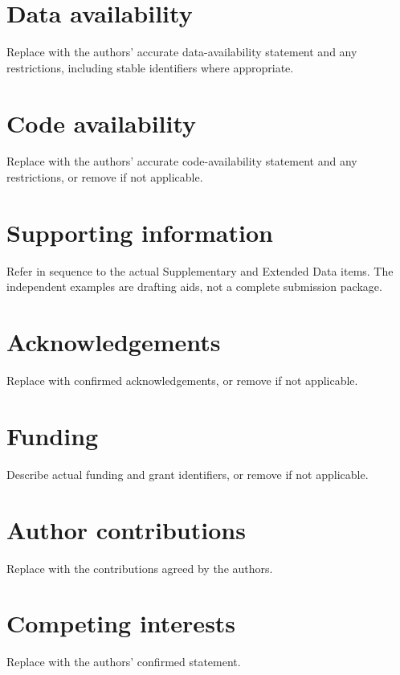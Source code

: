 \documentclass[11pt]{article}
\begin{document}
\section*{Data availability}
Replace with the authors' accurate data-availability statement and any
restrictions, including stable identifiers where appropriate.
\section*{Code availability}
Replace with the authors' accurate code-availability statement and any
restrictions, or remove if not applicable.




\section*{Supporting information}
Refer in sequence to the actual Supplementary and Extended Data items.
The independent examples are drafting aids, not a complete submission package.

\section*{Acknowledgements}
Replace with confirmed acknowledgements, or remove if not applicable.
\section*{Funding}
Describe actual funding and grant identifiers, or remove if not applicable.
\section*{Author contributions}
Replace with the contributions agreed by the authors.
\section*{Competing interests}
Replace with the authors' confirmed statement.
\end{document}
